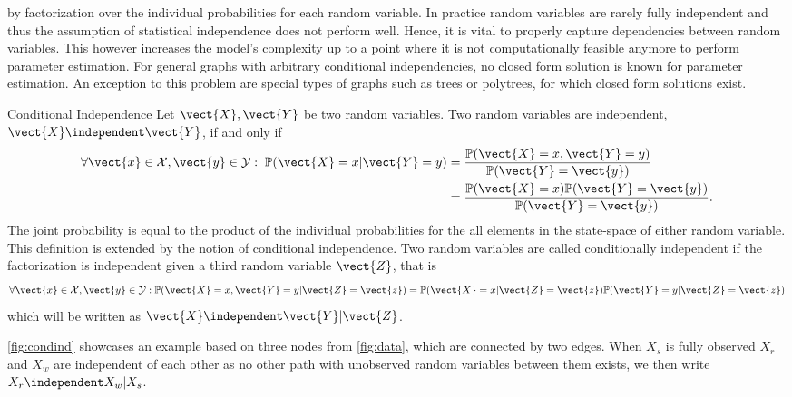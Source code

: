 by factorization over the individual probabilities for each random variable.
In practice random variables are rarely fully independent and thus the assumption of statistical independence does not perform well.
Hence, it is vital to properly capture dependencies between random variables.
This however increases the model's complexity up to a point where it is not computationally feasible anymore to perform parameter estimation.
For general graphs with arbitrary conditional independencies, no closed form solution is known for parameter estimation. 
An exception to this problem are special types of graphs such as trees or polytrees, for which closed form solutions exist.
\begin{definition}{Conditional Independence}
    Let $\vect{X}, \vect{Y}$ be two random variables. Two random variables are independent,  $\vect{X} \independent \vect{Y}$, if and only if
    \begin{equation}
        \begin{split}
        \forall \vect{x} \in \mathcal{X}, \vect{y} \in \mathcal{Y}:  \; \mathbb{P}(\vect{X} = x \lvert \vect{Y} = y) &= \frac{\mathbb{P}(\vect{X} = x , \vect{Y} = y)}{\mathbb{P}(\vect{Y} = \vect{y})} \\
        &=  \frac{\mathbb{P}(\vect{X} = x) \mathbb{P}(\vect{Y} = \vect{y})}{\mathbb{P}(\vect{Y} = \vect{y})}.  \\
        \end{split}
    \end{equation} 
    The joint probability is equal to the product of the individual probabilities for the all elements in the state-space of either random variable.
    This definition is extended by the notion of conditional independence. 
    Two random variables are called conditionally independent if the factorization is independent given a third random variable $\vect{Z}$, that is
    \begin{equation}
        \forall \vect{x} \in \mathcal{X}, \vect{y} \in \mathcal{Y}: \mathbb{P}(\vect{X} = x , \vect{Y} = y \lvert \vect{Z} = \vect{z}) =   \mathbb{P}(\vect{X} = x \lvert \vect{Z} = \vect{z}) \mathbb{P}(\vect{Y} = y \lvert \vect{Z} = \vect{z})
    \end{equation}
    which will be written as $\vect{X} \independent \vect{Y} \lvert \vect{Z}$.

    \fig \ref{fig:condind} showcases an example based on three nodes from \fig \ref{fig:data}, which are connected by two edges. 
    When $X_s$ is fully observed $X_r$ and $X_w$ are independent of each other as no other path with unobserved random variables between them exists, we then write $X_r \independent X_w \lvert X_s$.   
            

\end{definition}

